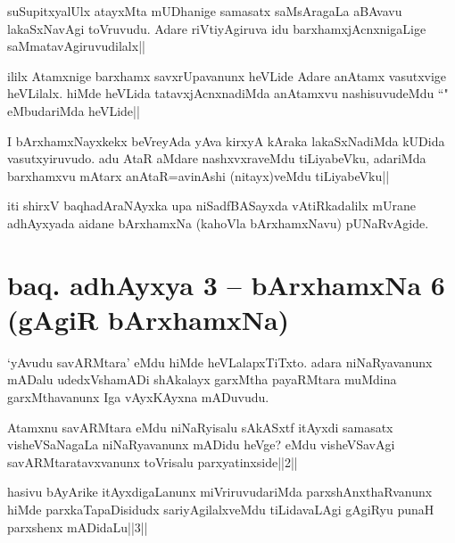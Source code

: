 
\begin{artha}
suSupitxyalUlx atayxMta mUDhanige samasatx saMsAragaLa aBAvavu lakaSxNavAgi toVruvudu. Adare riVtiyAgiruva idu barxhamxjAcnxnigaLige saMmatavAgiruvudilalx||
\end{artha}


\begin{artha}
ililx Atamxnige barxhamx savxrUpavanunx heVLide Adare anAtamx vasutxvige heVLilalx. hiMde heVLida tatavxjAcnxnadiMda anAtamxvu nashisuvudeMdu ``\stext " eMbudariMda heVLide||
\end{artha}

\begin{artha}
I bArxhamxNayxkekx beVreyAda yAva kirxyA kAraka lakaSxNadiMda kUDida vasutxyiruvudo. adu AtaR aMdare nashxvxraveMdu tiLiyabeVku, adariMda barxhamxvu mAtarx anAtaR=avinAshi (nitayx)veMdu tiLiyabeVku|| 
\end{artha}

\begin{center}
iti shirxV baqhadAraNAyxka upa niSadfBASayxda vAtiRkadalilx mUrane adhAyxyada aidane bArxhamxNa (kahoVla bArxhamxNavu) pUNaRvAgide.
\end{center}

\section*{baq. adhAyxya 3 -- bArxhamxNa 6 (gAgiR bArxhamxNa)}%

\begin{artha}
`yAvudu savARMtara' eMdu hiMde heVLalapxTiTxto. adara niNaRyavanunx mADalu udedxVshamADi shAkalayx garxMtha payaRMtara muMdina garxMthavanunx Iga vAyxKAyxna mADuvudu.
\end{artha}

\begin{artha}
Atamxnu savARMtara eMdu niNaRyisalu sAkASxtf itAyxdi samasatx visheVSaNagaLa niNaRyavanunx mADidu heVge? eMdu visheVSavAgi savARMtaratavxvanunx toVrisalu parxyatinxside||2||

hasivu bAyArike itAyxdigaLanunx miVriruvudariMda parxshAnxthaRvanunx hiMde parxkaTapaDisidudx sariyAgilalxveMdu tiLidavaLAgi gAgiRyu punaH parxshenx mADidaLu||3||
\end{artha}


